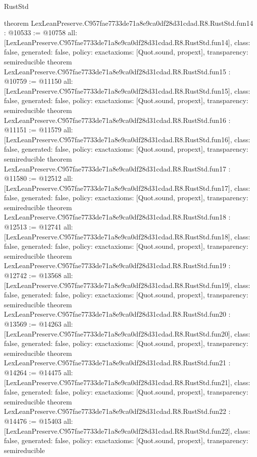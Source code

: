 \begin{lexlean}{RustStd}
\begin{coremodule}
{}
theorem LexLeanPreserve.C957fae7733de71a8e9ca0df28d31cdad.R8.RustStd.fun14 : @10533 := @10758 {
  all: [LexLeanPreserve.C957fae7733de71a8e9ca0df28d31cdad.R8.RustStd.fun14],
  class: false,
  generated: false,
  policy: exact{axioms: [Quot.sound, propext]},
  transparency: semireducible
}
theorem LexLeanPreserve.C957fae7733de71a8e9ca0df28d31cdad.R8.RustStd.fun15 : @10759 := @11150 {
  all: [LexLeanPreserve.C957fae7733de71a8e9ca0df28d31cdad.R8.RustStd.fun15],
  class: false,
  generated: false,
  policy: exact{axioms: [Quot.sound, propext]},
  transparency: semireducible
}
theorem LexLeanPreserve.C957fae7733de71a8e9ca0df28d31cdad.R8.RustStd.fun16 : @11151 := @11579 {
  all: [LexLeanPreserve.C957fae7733de71a8e9ca0df28d31cdad.R8.RustStd.fun16],
  class: false,
  generated: false,
  policy: exact{axioms: [Quot.sound, propext]},
  transparency: semireducible
}
theorem LexLeanPreserve.C957fae7733de71a8e9ca0df28d31cdad.R8.RustStd.fun17 : @11580 := @12512 {
  all: [LexLeanPreserve.C957fae7733de71a8e9ca0df28d31cdad.R8.RustStd.fun17],
  class: false,
  generated: false,
  policy: exact{axioms: [Quot.sound, propext]},
  transparency: semireducible
}
theorem LexLeanPreserve.C957fae7733de71a8e9ca0df28d31cdad.R8.RustStd.fun18 : @12513 := @12741 {
  all: [LexLeanPreserve.C957fae7733de71a8e9ca0df28d31cdad.R8.RustStd.fun18],
  class: false,
  generated: false,
  policy: exact{axioms: [Quot.sound, propext]},
  transparency: semireducible
}
theorem LexLeanPreserve.C957fae7733de71a8e9ca0df28d31cdad.R8.RustStd.fun19 : @12742 := @13568 {
  all: [LexLeanPreserve.C957fae7733de71a8e9ca0df28d31cdad.R8.RustStd.fun19],
  class: false,
  generated: false,
  policy: exact{axioms: [Quot.sound, propext]},
  transparency: semireducible
}
theorem LexLeanPreserve.C957fae7733de71a8e9ca0df28d31cdad.R8.RustStd.fun20 : @13569 := @14263 {
  all: [LexLeanPreserve.C957fae7733de71a8e9ca0df28d31cdad.R8.RustStd.fun20],
  class: false,
  generated: false,
  policy: exact{axioms: [Quot.sound, propext]},
  transparency: semireducible
}
theorem LexLeanPreserve.C957fae7733de71a8e9ca0df28d31cdad.R8.RustStd.fun21 : @14264 := @14475 {
  all: [LexLeanPreserve.C957fae7733de71a8e9ca0df28d31cdad.R8.RustStd.fun21],
  class: false,
  generated: false,
  policy: exact{axioms: [Quot.sound, propext]},
  transparency: semireducible
}
theorem LexLeanPreserve.C957fae7733de71a8e9ca0df28d31cdad.R8.RustStd.fun22 : @14476 := @15403 {
  all: [LexLeanPreserve.C957fae7733de71a8e9ca0df28d31cdad.R8.RustStd.fun22],
  class: false,
  generated: false,
  policy: exact{axioms: [Quot.sound, propext]},
  transparency: semireducible
}
\end{coremodule}
\end{lexlean}
